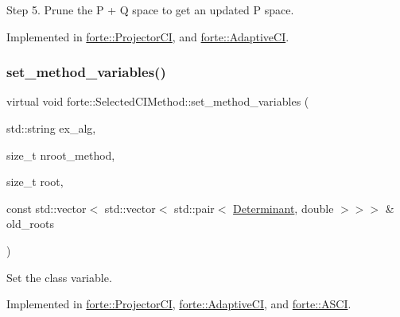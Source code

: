 Step 5. Prune the P + Q space to get an updated P space. 



Implemented in \mbox{\hyperlink{classforte_1_1_projector_c_i_a2f37b3d1e1751cc6bea1177a70be675c}{forte\+::\+Projector\+CI}}, and \mbox{\hyperlink{classforte_1_1_adaptive_c_i_abb5fb23e0c3d2575b9a5c9785bdc9f75}{forte\+::\+Adaptive\+CI}}.

\mbox{\label{classforte_1_1_selected_c_i_method_a37f95503d0241387195dc7d412fc6e78}} 
\subsubsection{\texorpdfstring{set\+\_\+method\+\_\+variables()}{set\_method\_variables()}}
{\footnotesize\ttfamily virtual void forte\+::\+Selected\+C\+I\+Method\+::set\+\_\+method\+\_\+variables (\begin{DoxyParamCaption}\item[{std\+::string}]{ex\+\_\+alg,  }\item[{size\+\_\+t}]{nroot\+\_\+method,  }\item[{size\+\_\+t}]{root,  }\item[{const std\+::vector$<$ std\+::vector$<$ std\+::pair$<$ \mbox{\hyperlink{namespaceforte_a2076c63fd7b8732004d9e1442ce527c1}{Determinant}}, double $>$$>$$>$ \&}]{old\+\_\+roots }\end{DoxyParamCaption})\hspace{0.3cm}{\ttfamily [pure virtual]}}



Set the class variable. 



Implemented in \mbox{\hyperlink{classforte_1_1_projector_c_i_af52dd5970339c390a9884b1cdad0a1d7}{forte\+::\+Projector\+CI}}, \mbox{\hyperlink{classforte_1_1_adaptive_c_i_a74874a321e8077f0af18967e9e2ebfd4}{forte\+::\+Adaptive\+CI}}, and \mbox{\hyperlink{classforte_1_1_a_s_c_i_aaf84a9fa2ec4f80da2cc05ac7ac544f9}{forte\+::\+A\+S\+CI}}.

\mbox{\label{classforte_1_1_selected_c_i_method_ad03bbde3a0443ca9b01ff9605f2e06e0}} 
